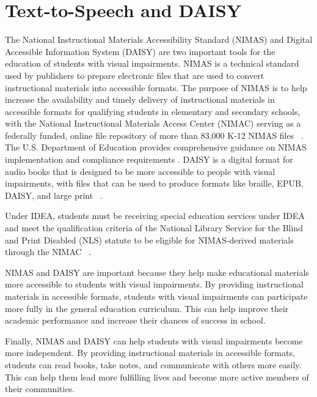 \chapter{Text-to-Speech and DAISY}\label{ch7:chap:text-to-speech-daisy}
\raggedright
The National Instructional Materials Accessibility Standard (NIMAS) and Digital Accessible Information System (DAISY) are two important tools for the education of students with visual impairments. NIMAS is a technical standard used by publishers to prepare electronic files that are used to convert instructional materials into accessible formats. The purpose of NIMAS is to help increase the availability and timely delivery of instructional materials in accessible formats for qualifying students in elementary and secondary schools, with the National Instructional Materials Access Center (NIMAC) serving as a federally funded, online file repository of more than 83,000 K-12 NIMAS files~ \supercite{NIMAC2025}. The U.S. Department of Education provides comprehensive guidance on NIMAS implementation and compliance requirements \supercite{USDeptEducation2021}. DAISY is a digital format for audio books that is designed to be more accessible to people with visual impairments, with files that can be used to produce formats like braille, EPUB, DAISY, and large print~ \supercite{DAISY2024, Wikipedia2024, MDPI2022}.

Under IDEA, students must be receiving special education services under IDEA and meet the qualification criteria of the National Library Service for the Blind and Print Disabled (NLS) statute to be eligible for NIMAS-derived materials through the NIMAC~ \supercite{CTEducation2025, IDEA2004}.

NIMAS and DAISY are important because they help make educational materials more accessible to students with visual impairments. By providing instructional materials in accessible formats, students with visual impairments can participate more fully in the general education curriculum. This can help improve their academic performance and increase their chances of success in school.\supercite{Kelly2011, StudentOutcomesResearch}

Finally, NIMAS and DAISY can help students with visual impairments become more independent. By providing instructional materials in accessible formats, students can read books, take notes, and communicate with others more easily. This can help them lead more fulfilling lives and become more active members of their communities.\supercite{Holbrook2006, Day2021}

